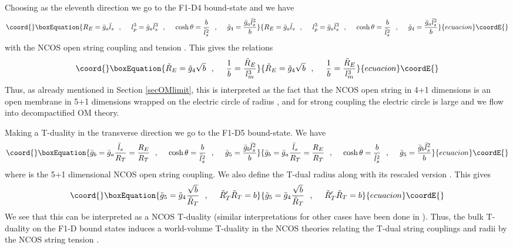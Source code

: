 \documentclass[a4paper,twoside,titlepage,12pt]{article}
\begin{document}
Choosing \coordHE{} as the eleventh direction
we go to the F1-D4 bound-state and we have
%
\begin{equation}\coord{}\boxEquation{
R_E = \gsba \lsb \spa
l_p^3 = \gsba \lsb^3 \spa
\cosh \theta = \frac{b}{\lsb^2} \spa
\tilde{g}_4 = \frac{\gsba \lsb^2}{b}
}{
R_E = \gsba \lsb \spa
l_p^3 = \gsba \lsb^3 \spa
\cosh \theta = \frac{b}{\lsb^2} \spa
\tilde{g}_4 = \frac{\gsba \lsb^2}{b}
}{ecuacion}\coordE{}\end{equation}
%
with the NCOS open string coupling \coordHE{} and tension \coordHE{}.
This gives the relations
%
\begin{equation}\coord{}\boxEquation{
\tilde{R}_E = \tilde{g}_4 \sqrt{b} \spa
\frac{1}{b} = \frac{\tilde{R}_E}{\lm^3}
}{
\tilde{R}_E = \tilde{g}_4 \sqrt{b} \spa
\frac{1}{b} = \frac{\tilde{R}_E}{\lm^3}
}{ecuacion}\coordE{}\end{equation}
%
Thus, as already mentioned in Section \ref{secOMlimit}, this is interpreted
\cite{Gopakumar:2000ep,Bergshoeff:2000ai}
as the fact that the NCOS open string in 4+1 dimensions is an
 open membrane in 5+1 dimensions wrapped on the electric circle of 
radius \coordHE{}, and for strong coupling
the electric circle is large and we flow into decompactified 
OM theory.

Making a T-duality in the transverse direction \coordHE{} we go to the
F1-D5 bound-state. We have
%
\begin{equation}\coord{}\boxEquation{
\gsbb = \gsba \frac{\lsb}{R_T} = \frac{R_E}{R_T} \spa
\cosh \theta = \frac{b}{\lsb^2} \spa 
\tilde{g}_5 = \frac{\gsbb \lsb^2}{b}
}{
\gsbb = \gsba \frac{\lsb}{R_T} = \frac{R_E}{R_T} \spa
\cosh \theta = \frac{b}{\lsb^2} \spa 
\tilde{g}_5 = \frac{\gsbb \lsb^2}{b}
}{ecuacion}\coordE{}\end{equation}
%
where \coordHE{} is the 5+1 dimensional NCOS open string coupling.
We also define the T-dual radius \coordHE{} along with
its rescaled version \coordHE{}.
This gives 
%
\begin{equation}\coord{}\boxEquation{
\label{NCOSTdual}
\tilde{g}_5 = \tilde{g}_4 \frac{\sqrt{b}}{\tilde{R}_T} \spa
\tilde{R}'_T \tilde{R}_T = b
}{
\tilde{g}_5 = \tilde{g}_4 \frac{\sqrt{b}}{\tilde{R}_T} \spa
\tilde{R}'_T \tilde{R}_T = b
}{ecuacion}\coordE{}\end{equation}
%
We see that this can be interpreted as a NCOS T-duality (similar
interpretations for other cases have been done in 
\cite{Bergshoeff:2000ai,Kawano:2000gn}).
Thus, the bulk T-duality on the F1-D\coordHE{} bound states induces 
a world-volume T-duality in the NCOS theories relating the
T-dual string couplings and radii by the NCOS string tension \coordHE{}.
\end{document}
